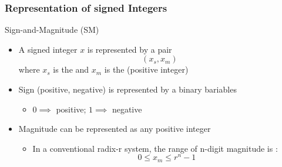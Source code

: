 \subsubsection{Representation of signed Integers}
\begin{parag}{Sign-and-Magnitude (SM)}
    \begin{itemize}
        \item A signed integer $x$ is represented by a pair
        \[(x_s, x_m)\]
        where $x_s$ is the  and $x_m$ is the  (positive integer)
        \item Sign (positive, negative) is represented by a binary bariables 
        \begin{itemize}
            \item $0 \implies$ positive; $1 \implies $ negative
        \end{itemize}
        \item Magnitude can be represented as any positive integer
        \begin{itemize}
            \item In a conventional radix-r system, the range of n-digit magnitude is :
            \[0 \leq x_m \leq r^n - 1\]
        \end{itemize}
    \end{itemize}
\end{parag}
